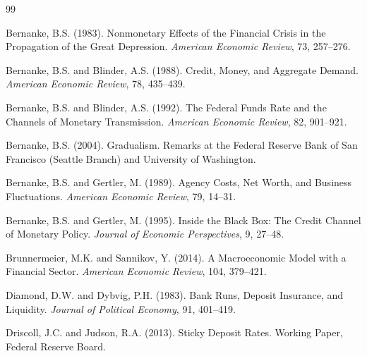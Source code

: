 \documentclass[12pt,a4paper]{article}
\begin{document}
\newpage
\begin{thebibliography}{99}
\setlength{\itemsep}{4pt}

Bernanke, B.S. (1983).
\newblock Nonmonetary Effects of the Financial Crisis in the Propagation of the
  Great Depression.
\newblock \textit{American Economic Review}, 73, 257--276.

Bernanke, B.S. and Blinder, A.S. (1988).
\newblock Credit, Money, and Aggregate Demand.
\newblock \textit{American Economic Review}, 78, 435--439.

Bernanke, B.S. and Blinder, A.S. (1992).
\newblock The Federal Funds Rate and the Channels of Monetary Transmission.
\newblock \textit{American Economic Review}, 82, 901--921.

Bernanke, B.S. (2004).
\newblock Gradualism.
\newblock Remarks at the Federal Reserve Bank of San Francisco (Seattle Branch)
  and University of Washington.

Bernanke, B.S. and Gertler, M. (1989).
\newblock Agency Costs, Net Worth, and Business Fluctuations.
\newblock \textit{American Economic Review}, 79, 14--31.

Bernanke, B.S. and Gertler, M. (1995).
\newblock Inside the Black Box: The Credit Channel of Monetary Policy.
\newblock \textit{Journal of Economic Perspectives}, 9, 27--48.

Brunnermeier, M.K. and Sannikov, Y. (2014).
\newblock A Macroeconomic Model with a Financial Sector.
\newblock \textit{American Economic Review}, 104, 379--421.

Diamond, D.W. and Dybvig, P.H. (1983).
\newblock Bank Runs, Deposit Insurance, and Liquidity.
\newblock \textit{Journal of Political Economy}, 91, 401--419.

Driscoll, J.C. and Judson, R.A. (2013).
\newblock Sticky Deposit Rates.
\newblock Working Paper, Federal Reserve Board.


\end{thebibliography}
\end{document}

